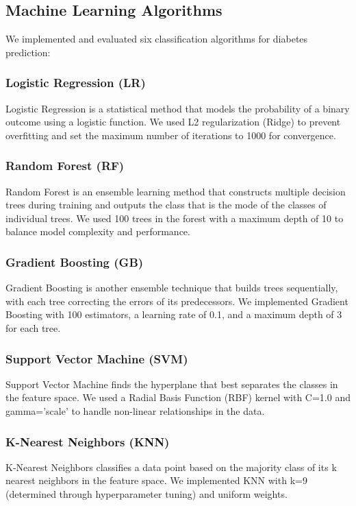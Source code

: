 \documentclass[conference]{IEEEtran}
\begin{document}
\subsection{Machine Learning Algorithms}
We implemented and evaluated six classification algorithms for diabetes prediction:

\subsubsection{Logistic Regression (LR)}
Logistic Regression is a statistical method that models the probability of a binary outcome using a logistic function. We used L2 regularization (Ridge) to prevent overfitting and set the maximum number of iterations to 1000 for convergence.

\subsubsection{Random Forest (RF)}
Random Forest is an ensemble learning method that constructs multiple decision trees during training and outputs the class that is the mode of the classes of individual trees. We used 100 trees in the forest with a maximum depth of 10 to balance model complexity and performance.

\subsubsection{Gradient Boosting (GB)}
Gradient Boosting is another ensemble technique that builds trees sequentially, with each tree correcting the errors of its predecessors. We implemented Gradient Boosting with 100 estimators, a learning rate of 0.1, and a maximum depth of 3 for each tree.

\subsubsection{Support Vector Machine (SVM)}
Support Vector Machine finds the hyperplane that best separates the classes in the feature space. We used a Radial Basis Function (RBF) kernel with C=1.0 and gamma='scale' to handle non-linear relationships in the data.

\subsubsection{K-Nearest Neighbors (KNN)}
K-Nearest Neighbors classifies a data point based on the majority class of its k nearest neighbors in the feature space. We implemented KNN with k=9 (determined through hyperparameter tuning) and uniform weights.
\end{document}
